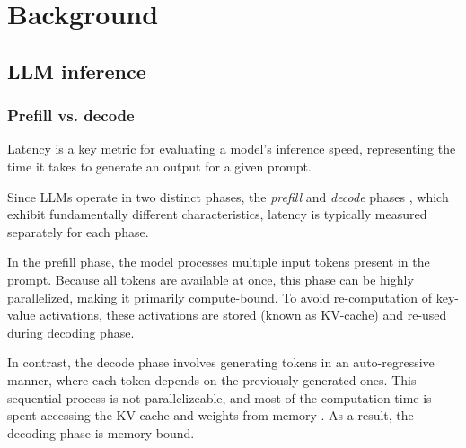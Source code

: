 
\chapter{Background}
\section{LLM inference}
\subsection{Prefill vs. decode}
Latency is a key metric for evaluating a model’s inference speed, representing the time it takes to generate an output for a given prompt.

Since LLMs operate in two distinct phases, the \textit{prefill} and \textit{decode} phases \parencite{efficientlyscaling}, which exhibit fundamentally different characteristics, latency is typically measured separately for each phase.

In the prefill phase, the model processes multiple input tokens present in the prompt. Because all tokens are available at once, this phase can be highly parallelized, making it primarily compute-bound. To avoid re-computation of key-value activations, these activations are stored (known as KV-cache) \parencite{kivi, cachegen, flexgen, kvquant} and re-used during decoding phase. 

In contrast, the decode phase involves generating tokens in an auto-regressive manner, where each token depends on the previously generated ones. This sequential process is not parallelizeable, and most of the computation time is spent accessing the KV-cache and weights from memory \parencite{kvquant, kivi}. As a result, the decoding phase is memory-bound.

